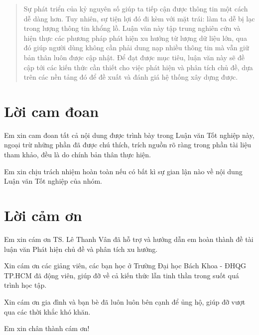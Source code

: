 \begin{abstract}
	Sự phát triển của kỷ nguyên số giúp ta tiếp cận được thông tin một cách dễ dàng hơn. Tuy nhiên, sự tiện lợi đó đi kèm với mặt trái: làm ta dễ bị lạc trong lượng thông tin khổng lồ. Luận văn này tập trung nghiên cứu và hiện thực các phương pháp phát hiện xu hướng từ lượng dữ liệu lớn, qua đó giúp người dùng không cần phải dung nạp nhiều thông tin mà vẫn giữ bản thân luôn được cập nhật. Để đạt được mục tiêu, luận văn này sẽ đề cập tới các kiến thức cần thiết cho việc phát hiện và phân tích chủ đề, dựa trên các nền tảng đó để đề xuất và đánh giá hệ thống xây dựng được.
\end{abstract}
\clearpage

\chapter*{Lời cam đoan}
\thispagestyle{empty}
Em xin cam đoan tất cả nội dung được trình bày trong Luận văn Tốt nghiệp này, ngoại trừ những phần đã được chú thích, trích nguồn rõ ràng trong phần tài liệu tham khảo, đều là do chính bản thân thực hiện.

Em xin chịu trách nhiệm hoàn toàn nếu có bất kì sự gian lận nào về nội dung Luận văn Tốt nghiệp của nhóm.

\chapter*{Lời cảm ơn}
\thispagestyle{empty}

Em xin cám ơn TS. Lê Thanh Vân đã hỗ trợ và hướng dẫn em hoàn thành đề tài luận văn Phát hiện chủ đề và phân tích xu hướng.

Xin cám ơn các giảng viên, các bạn học ở Trường Đại học Bách Khoa - ĐHQG TP.HCM đã động viên, giúp đỡ về cả kiến thức lẫn tinh thần trong suốt quá trình học tập.

Xin cám ơn gia đình và bạn bè đã luôn luôn bên cạnh để ủng hộ, giúp đỡ vượt qua các thời khắc khó khăn.

Em xin chân thành cám ơn!
